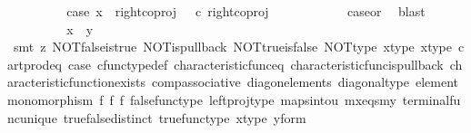 \begin{isabellebody}
\ \ \ \ \ \ \isamarkupfalse%
\ \isamarkupfalse%
\ case{}{\isacharcolon}{\kern0pt}\ {\isachardoublequoteopen}x\ {\isacharequal}{\kern0pt}\ right{\isacharunderscore}{\kern0pt}coproj\ {\isasymone}\ {\isacharparenleft}{\kern0pt}{\isasymone}{\isasymCoprod}{\isasymone}{\isacharparenright}{\kern0pt}\ {\isasymcirc}\isactrlsub c\ right{\isacharunderscore}{\kern0pt}coproj\ {\isasymone}\ {\isasymone}{\isachardoublequoteclose}\isanewline
\ \ \ \ \ \ \ \ \isamarkupfalse%
\ case{}{\isacharunderscore}{\kern0pt}or{\isacharunderscore}{\kern0pt}{}\ \isamarkupfalse%
\ blast\isanewline
\ \ \ \ \ \ \isamarkupfalse%
\ \isamarkupfalse%
\ {\isachardoublequoteopen}x\ {\isacharequal}{\kern0pt}\ y{\isachardoublequoteclose}\isanewline
\ \ \ \ \ \ \ \ \isamarkupfalse%
\ {\isacharparenleft}{\kern0pt}smt\ {\isacharparenleft}{\kern0pt}z{}{\isacharparenright}{\kern0pt}\ NOT{\isacharunderscore}{\kern0pt}false{\isacharunderscore}{\kern0pt}is{\isacharunderscore}{\kern0pt}true\ NOT{\isacharunderscore}{\kern0pt}is{\isacharunderscore}{\kern0pt}pullback\ NOT{\isacharunderscore}{\kern0pt}true{\isacharunderscore}{\kern0pt}is{\isacharunderscore}{\kern0pt}false\ NOT{\isacharunderscore}{\kern0pt}type\ x{\isacharunderscore}{\kern0pt}type\ x{\isacharunderscore}{\kern0pt}type{\isacharprime}{\kern0pt}\ cart{\isacharunderscore}{\kern0pt}prod{\isacharunderscore}{\kern0pt}eq{}\ case{}\ cfunc{\isacharunderscore}{\kern0pt}type{\isacharunderscore}{\kern0pt}def\ characteristic{\isacharunderscore}{\kern0pt}func{\isacharunderscore}{\kern0pt}eq\ characteristic{\isacharunderscore}{\kern0pt}func{\isacharunderscore}{\kern0pt}is{\isacharunderscore}{\kern0pt}pullback\ characteristic{\isacharunderscore}{\kern0pt}function{\isacharunderscore}{\kern0pt}exists\ comp{\isacharunderscore}{\kern0pt}associative\ diag{\isacharunderscore}{\kern0pt}on{\isacharunderscore}{\kern0pt}elements\ diagonal{\isacharunderscore}{\kern0pt}type\ element{\isacharunderscore}{\kern0pt}monomorphism\ f{}\ f{}\ f{}\ false{\isacharunderscore}{\kern0pt}func{\isacharunderscore}{\kern0pt}type\ left{\isacharunderscore}{\kern0pt}proj{\isacharunderscore}{\kern0pt}type\ maps{\isacharunderscore}{\kern0pt}into{\isacharunderscore}{\kern0pt}{}u{}\ mx{\isacharunderscore}{\kern0pt}eqs{\isacharunderscore}{\kern0pt}my\ terminal{\isacharunderscore}{\kern0pt}func{\isacharunderscore}{\kern0pt}unique\ true{\isacharunderscore}{\kern0pt}false{\isacharunderscore}{\kern0pt}distinct\ true{\isacharunderscore}{\kern0pt}func{\isacharunderscore}{\kern0pt}type\ x{\isacharunderscore}{\kern0pt}type\ y{\isacharunderscore}{\kern0pt}form{\isacharparenright}{\kern0pt}\isanewline

\end{isabellebody}
